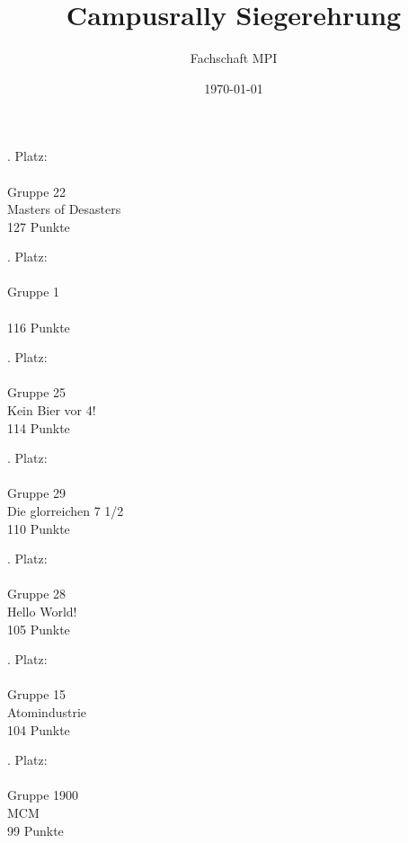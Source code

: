 \documentclass{beamer}
\title{Campusrally Siegerehrung}
\subtitle{Fachschaft MPI}
\author{}
\date{\today}
\begin{document}
\maketitle


\begin{frame}
\huge
{}. Platz:
\\
\ \\
Gruppe 22
\\
Masters of Desasters
\\
127 Punkte
\end{frame}

\begin{frame}
\huge
{}. Platz:
\\
\ \\
Gruppe 1
\\
\
\\
116 Punkte
\end{frame}

\begin{frame}
\huge
{}. Platz:
\\
\ \\
Gruppe 25
\\
Kein Bier vor 4!
\\
114 Punkte
\end{frame}

\begin{frame}
\huge
{}. Platz:
\\
\ \\
Gruppe 29
\\
Die glorreichen 7 1/2
\\
110 Punkte
\end{frame}

\begin{frame}
\huge
{}. Platz:
\\
\ \\
Gruppe 28
\\
Hello World!
\\
105 Punkte
\end{frame}

\begin{frame}
\huge
{}. Platz:
\\
\ \\
Gruppe 15
\\
Atomindustrie
\\
104 Punkte
\end{frame}

\begin{frame}
\huge
{}. Platz:
\\
\ \\
Gruppe 1900
\\
MCM
\\
99 Punkte
\end{frame}
\end{document}
